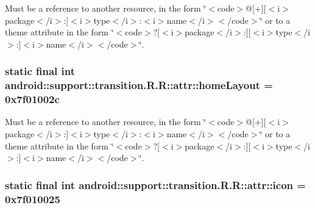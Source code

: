 Must be a reference to another resource, in the form \char`\"{}$<$code$>$@\mbox{[}+\mbox{]}\mbox{[}$<$i$>$package$<$/i$>$:\mbox{]}$<$i$>$type$<$/i$>$:$<$i$>$name$<$/i$>$$<$/code$>$\char`\"{} or to a theme attribute in the form \char`\"{}$<$code$>$?\mbox{[}$<$i$>$package$<$/i$>$:\mbox{]}\mbox{[}$<$i$>$type$<$/i$>$:\mbox{]}$<$i$>$name$<$/i$>$$<$/code$>$\char`\"{}. \hypertarget{classandroid_1_1support_1_1transition_1_1_r_1_1attr_40330f9f46c161a7c7efbabeb64b4625}{
\subsubsection[{homeLayout}]{\setlength{\rightskip}{0pt plus 5cm}static final int android::support::transition.R.R::attr::homeLayout = 0x7f01002c}}
\label{classandroid_1_1support_1_1transition_1_1_r_1_1attr_40330f9f46c161a7c7efbabeb64b4625}


Must be a reference to another resource, in the form \char`\"{}$<$code$>$@\mbox{[}+\mbox{]}\mbox{[}$<$i$>$package$<$/i$>$:\mbox{]}$<$i$>$type$<$/i$>$:$<$i$>$name$<$/i$>$$<$/code$>$\char`\"{} or to a theme attribute in the form \char`\"{}$<$code$>$?\mbox{[}$<$i$>$package$<$/i$>$:\mbox{]}\mbox{[}$<$i$>$type$<$/i$>$:\mbox{]}$<$i$>$name$<$/i$>$$<$/code$>$\char`\"{}. \hypertarget{classandroid_1_1support_1_1transition_1_1_r_1_1attr_a328c1613f8f0fb7d0c1f8af33340943}{
\subsubsection[{icon}]{\setlength{\rightskip}{0pt plus 5cm}static final int android::support::transition.R.R::attr::icon = 0x7f010025}}
\label{classandroid_1_1support_1_1transition_1_1_r_1_1attr_a328c1613f8f0fb7d0c1f8af33340943}


